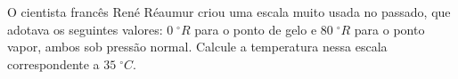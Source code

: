 %
%
    O cientista francês René Réaumur criou uma escala muito usada no passado, que adotava os seguintes valores: $0\;^\circ R$ para o ponto de gelo e $80\;^\circ R$ para o ponto vapor, ambos sob pressão normal. Calcule a temperatura nessa escala correspondente a $35\;^\circ C$.
